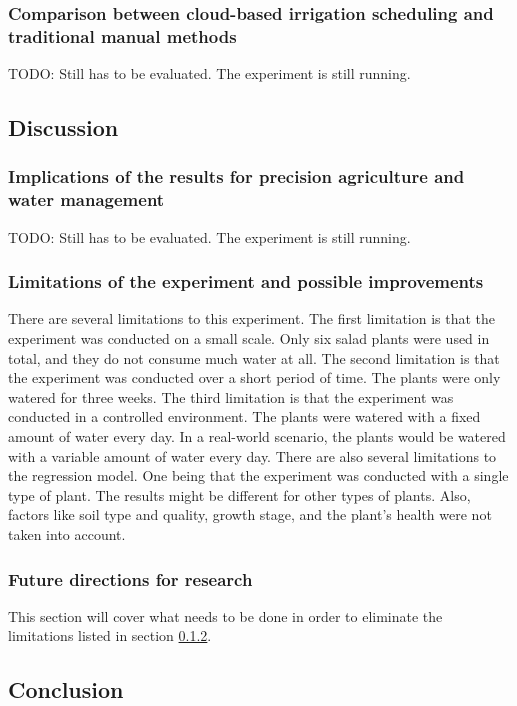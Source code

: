 \documentclass[11pt]{scrartcl} %
\begin{document}
\subsubsection{Comparison between cloud-based irrigation scheduling and traditional manual methods}
TODO: Still has to be evaluated. The experiment is still running.
\subsection{Discussion}
\subsubsection{Implications of the results for precision agriculture and water management}
TODO: Still has to be evaluated. The experiment is still running.

\subsubsection{Limitations of the experiment and possible improvements}
\label{sec:limitations}
There are several limitations to this experiment. The first limitation is that the experiment was conducted on a small scale. Only six salad plants were used in total, and they do not consume much water at all. The second limitation is that the experiment was conducted over a short period of time. The plants were only watered for three weeks. The third limitation is that the experiment was conducted in a controlled environment. The plants were watered with a fixed amount of water every day. In a real-world scenario, the plants would be watered with a variable amount of water every day.
\newline There are also several limitations to the regression model. One being that the experiment was conducted with a single type of plant. The results might be different for other types of plants. Also, factors like soil type and quality, growth stage, and the plant's health were not taken into account.

\subsubsection{Future directions for research}
This section will cover what needs to be done in order to eliminate the limitations listed in section \ref{sec:limitations}.

\subsection{Conclusion}
\end{document}
